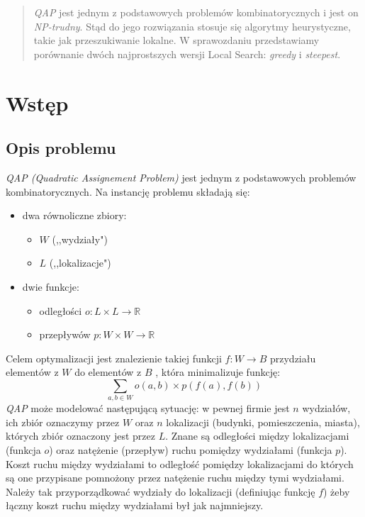 \documentclass{article}
\begin{document}


\begin{abstract}
\emph{QAP} jest jednym z podstawowych problemów kombinatorycznych i jest on \emph{NP-trudny}. Stąd do jego rozwiązania stosuje się algorytmy heurystyczne, takie jak przeszukiwanie lokalne. W sprawozdaniu przedstawiamy porównanie dwóch najprostszych wersji Local Search: \emph{greedy} i \emph{steepest}.
\end{abstract}


\section{Wstęp}
	\subsection{Opis problemu}
	\emph{\emph{QAP} (Quadratic Assignement Problem)} jest jednym z podstawowych problemów kombinatorycznych. Na instancję problemu składają się:
	\begin{itemize}
		\item{dwa równoliczne zbiory:
			\begin{itemize}
				\item{ $W$ (,,wydziały") }
				\item{ $L$ (,,lokalizacje")}
			\end{itemize}
			}
		\item{dwie funkcje:
			\begin{itemize}
				\item{ odległości $o:  L \times L \rightarrow \mathbb{R} $}
				\item{ przepływów $p: W \times W \rightarrow \mathbb{R} $}
			\end{itemize}}
	\end{itemize}
		Celem optymalizacji jest znalezienie takiej funkcji $ f: W \rightarrow B $  przydziału elementów z $W$ do elementów z $B$ , która minimalizuje funkcję:
	$$\sum_{a,b \in W}o(a,b)\times p(f(a),f(b))$$
	\emph{QAP} może modelować następującą sytuację: w pewnej firmie jest $n$ wydziałów, ich zbiór oznaczymy przez $W$ oraz $n$ lokalizacji (budynki, pomieszczenia, miasta), których zbiór oznaczony jest przez $L$. Znane są odległości między lokalizacjami (funkcja $o$) oraz natężenie (przepływ) ruchu pomiędzy wydziałami (funkcja $p$). Koszt ruchu między wydziałami to odległość pomiędzy lokalizacjami do których są one przypisane pomnożony przez natężenie ruchu między tymi wydziałami. Należy tak przyporządkować wydziały do lokalizacji (definiując funkcję $f$) żeby łączny koszt ruchu między wydziałami był jak najmniejszy.
\end{document}
